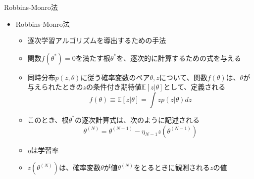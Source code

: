 \documentclass[dvipdfmx,notheorems,t]{beamer}
\begin{document}
\begin{frame}{Robbins-Monro法}

\begin{itemize}
	\item Robbins-Monro法
	\begin{itemize}
		\item 逐次学習アルゴリズムを導出するための手法
		\item 関数$f(\theta^*) = 0$を満たす根$\theta^*$を、逐次的に計算するための式を与える
		\newline
		\item 同時分布$p(z, \theta)$に従う確率変数のペア$\theta, z$について、関数$f(\theta)$は、$\theta$が与えられたときの$z$の条件付き期待値$\mathbb{E} \left[ z | \theta \right]$として、定義される
		\begin{equation}
			f(\theta) \equiv \mathbb{E} \left[ z | \theta \right] = \int z p(z | \theta) dz
		\end{equation}
		\item このとき、根$\theta^*$の逐次計算式は、次のように記述される
		\begin{equation}
			\theta^{(N)} = \theta^{(N - 1)} - \eta_{N - 1} z(\theta^{(N - 1)})
		\end{equation}
		\item $\eta$は学習率
		\item $z(\theta^{(N)})$は、確率変数$\theta$が値$\theta^{(N)}$をとるときに観測される$z$の値
	\end{itemize}
\end{itemize}

\end{frame}
\end{document}
